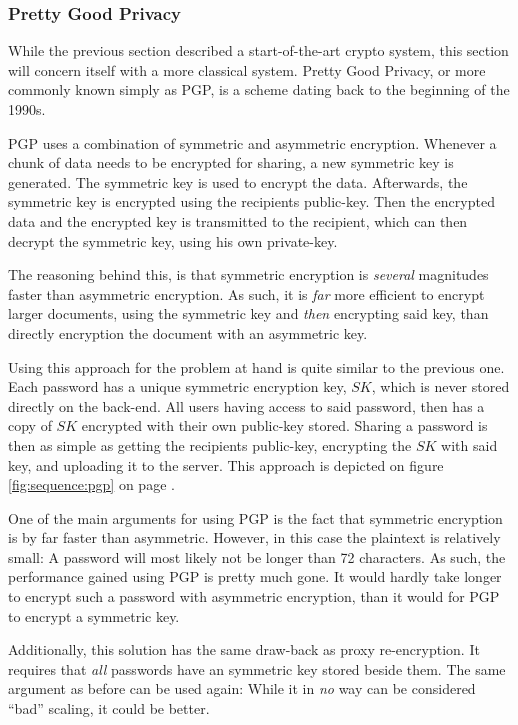 			\subsubsection{Pretty Good Privacy}
				While the previous section described a start-of-the-art crypto system, this section will concern itself with a more classical system. Pretty Good Privacy, or more commonly known simply as PGP, is a scheme dating back to the beginning of the 1990s.

				PGP uses a combination of symmetric and asymmetric encryption. Whenever a chunk of data needs to be encrypted for sharing, a new symmetric key is generated. The symmetric key is used to encrypt the data. Afterwards, the symmetric key is encrypted using the recipients public-key. Then the encrypted data and the encrypted key is transmitted to the recipient, which can then decrypt the symmetric key, using his own private-key. 

				The reasoning behind this, is that symmetric encryption is \emph{several} magnitudes faster than asymmetric encryption. As such, it is \emph{far} more efficient to encrypt larger documents, using the symmetric key and \emph{then} encrypting said key, than directly encryption the document with an asymmetric key.

				Using this approach for the problem at hand is quite similar to the previous one. Each password has a unique symmetric encryption key, $SK$, which is never stored directly on the back-end. All users having access to said password, then has a copy of $SK$ encrypted with their own public-key stored. Sharing a password is then as simple as getting the recipients public-key, encrypting the $SK$ with said key, and uploading it to the server. This approach is depicted on figure \ref{fig:sequence:pgp} on page \pageref{fig:sequence:pgp}.

				One of the main arguments for using PGP is the fact that symmetric encryption is by far faster than asymmetric. However, in this case the plaintext is relatively small: A password will most likely not be longer than 72 characters. As such, the performance gained using PGP is pretty much gone. It would hardly take longer to encrypt such a password with asymmetric encryption, than it would for PGP to encrypt a symmetric key.

				Additionally, this solution has the same draw-back as proxy re-encryption. It requires that \emph{all} passwords have an symmetric key stored beside them. The same argument as before can be used again: While it in \emph{no} way can be considered ``bad'' scaling, it could be better.

